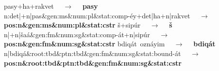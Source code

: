 % 


\begin{exe}
\ex \label{ex:cstr:pasey2}
	\textsf{pasy+ha+rakvet} $\quad\to\quad$ 
	\textbf{\textsf{pasy}} \\
	\textsf{n:det|+n|pas\&gen:ms\&num:pl\&stat:comp-\'{e}y+det|ha+n|rakvet} $\quad\to\quad$ \\
	\textbf{\textsf{pos:n\&gen:ms\&num:pl\&stat:cstr}}
\ex \label{ex:cstr:shaat2} 
	\textsf{\v{s}+sip\'{u}r} $\quad\to\quad$ \textbf{\textsf{\v{s}}}\\
	\textsf{n|+n|\v{s}a\'a\&gen:fm\&num:sg\&stat:comp-\'at+n|sip\'ur} $\quad\to\quad$ \\
	\textbf{\textsf{pos:n\&gen:fm\&num:sg\&stat:cstr}}
\ex \label{ex:cstr:bdiqat2} 
	\textsf{bdiq\'{a}t\, ozn\'{a}yim} $\quad\to\quad$ \textbf{\textsf{\textsf{bdiq\'{a}t}}} \\ 
	\textsf{n|bdiq\'{a}\&root:tbd\&ptn:tbd\&gen:fm\&num:sg\&stat:bound-\'{a}t} $\quad\to\quad$ \\
	\textbf{\textsf{pos:n\&root:tbd\&ptn:tbd\&gen:fm\&num:sg\&stat:cstr}}
\end{exe}

